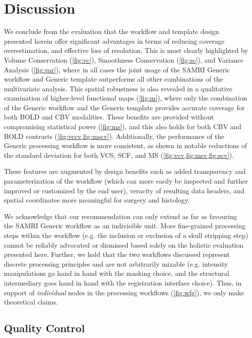 \section{Discussion}

We conclude from the evaluation that the workflow and template design presented herein offer significant advantages in terms of reducing coverage overestimation, and effective loss of resolution.
This is most clearly highlighted by Volume Conservation (\cref{fig:vc}), Smoothness Conservation (\cref{fig:sc}), and Variance Analysis (\cref{fig:var}), where in all cases the joint usage of the SAMRI Generic workflow and Generic template outperforms all other combinations of the multivariate analysis.
This spatial robustness is also revealed in a qualitative examination of higher-level functional maps (\cref{fig:m}), where only the combination of the Generic workflow and the Generic template provides accurate coverage for both BOLD and CBV modalities.
These benefits are provided without compromising statistical power (\cref{fig:ms}), and this also holds for both CBV and BOLD contrasts (\cref{fig:vccv,fig:mscv}).
Additionally, the performance of the Generic processing workflow is more consistent, as shown in notable reductions of the standard deviation for both VCS, SCF, and MS (\cref{fig:vcv,fig:msv,fig:scv}).

These features are augmented by design benefits such as added transparency and parameterization of the workflow (which can more easily be inspected and further improved or customized by the end user), veracity of resulting data headers, and spatial coordinates more meaningful for surgery and histology.

We acknowledge that our recommendation can only extend as far as favouring the SAMRI Generic workflow as an indivisible unit.
More fine-grained processing steps within the workflow (e.g. the inclusion or exclusion of a skull stripping step) cannot be reliably advocated or dismissed based solely on the holistic evaluation presented here.
Further, we hold that the two workflows discussed represent discrete processing principles and are not arbitrarily mixable (e.g. intensity manipulations go hand in hand with the masking choice, and the structural intermediary goes hand in hand with the registration interface choice).
Thus, in support of \textit{individual} nodes in the processing workflows (\cref{fig:wfg}), we only make theoretical claims.

\subsection{Quality Control}


